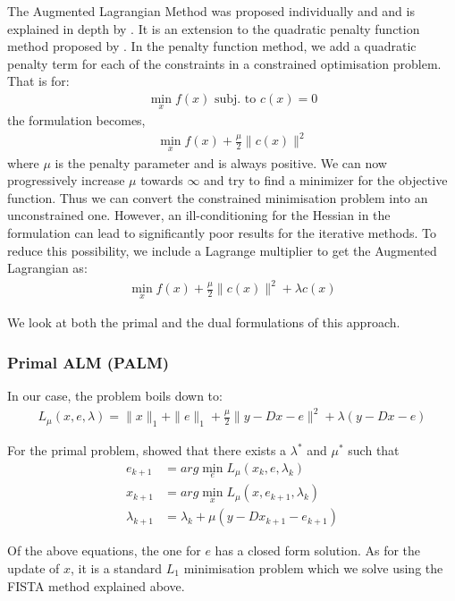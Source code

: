 \documentclass{article} %
\begin{document}
The Augmented Lagrangian Method was proposed individually \cite{powell1964efficient} and \cite{hestenes1969multiplier} and is explained in depth by \cite{wright1999numerical}. It is an extension to the quadratic penalty function method proposed by \cite{courant1943variational}. In the penalty function method, we add a quadratic penalty term for each of the constraints in a constrained optimisation problem. That is for:
\begin{align}
\min\limits_x f(x) \text{ subj. to } c(x) = 0
\end{align}
the formulation becomes,
\begin{align}
\min\limits_x f(x) + \frac{\mu}{2}\|c(x)\|^2
\end{align}
where $\mu$ is the penalty parameter and is always positive. We can now progressively increase $\mu$ towards $\infty$ and try to find a minimizer for the objective function.
Thus we can convert the constrained minimisation problem into an unconstrained one. However, an ill-conditioning for the Hessian in the formulation can lead to significantly poor results for the iterative methods. To reduce this possibility, we include a Lagrange multiplier to get the Augmented Lagrangian as:
\begin{align}
\min\limits_x f(x) + \frac{\mu}{2}\|c(x)\|^2 + \lambda c(x)
\end{align}

We look at both the primal and the dual formulations of this approach.


\subsubsection{Primal ALM (PALM)}

In our case, the problem boils down to:
\begin{align}
L_{\mu}(x,e,\lambda) = \|x\|_1 + \|e\|_1 + \frac{\mu}{2}\|y - Dx - e\|^2 + \lambda (y - Dx - e)
\end{align}

For the primal problem, \cite{bertsekasnonlinear} showed that there exists a $\lambda^{*}$ and $\mu^{*}$ such that
\begin{align}
e_{k+1} &= arg \min_e L_{\mu}(x_k,e,\lambda_k)\\
x_{k+1} &= arg \min_x L_{\mu}(x,e_{k+1},\lambda_k)\\
\lambda_{k+1} &= \lambda_k + \mu(y - Dx_{k+1} - e_{k+1})
\end{align}

Of the above equations, the one for $e$ has a closed form solution. As for the update of $x$, it is a standard $L_1$ minimisation problem which we solve using the FISTA method explained above.
\end{document}
